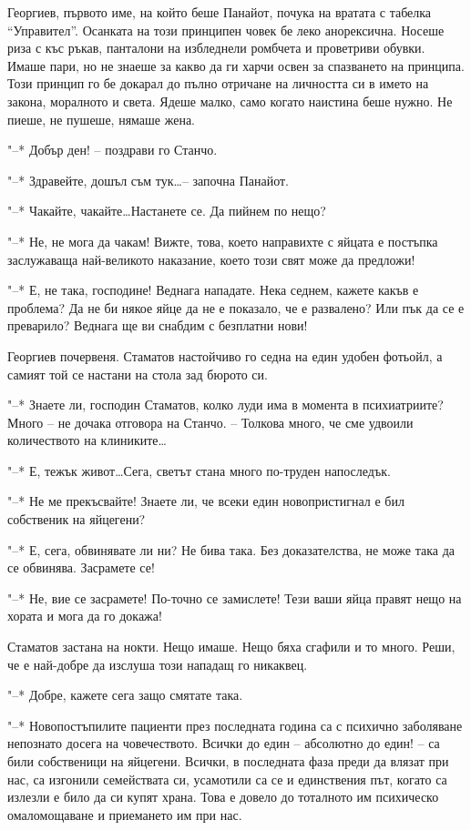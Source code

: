 \documentclass[ebook,openany,12pt]{memoir}
\begin{document}
Георгиев, първото име, на който беше Панайот, почука на вратата с табелка ``Управител''. Осанката на този принципен човек бе леко анорексична. Носеше риза с къс ръкав, панталони на избледнели ромбчета и проветриви обувки. Имаше пари, но не знаеше за какво да ги харчи освен за спазването на принципа. Този принцип го бе докарал до пълно отричане на личността си в името на закона, моралното и света. Ядеше малко, само когато наистина беше нужно. Не пиеше, не пушеше, нямаше жена.

"--* Добър ден! – поздрави го Станчо.

"--* Здравейте, дошъл съм тук\ldots – започна Панайот.

"--* Чакайте, чакайте\ldots Настанете се. Да пийнем по нещо?

"--* Не, не мога да чакам! Вижте, това, което направихте с яйцата е постъпка заслужаваща най-великото наказание, което този свят може да предложи!

"--* Е, не така, господине! Веднага нападате. Нека седнем, кажете какъв е проблема? Да не би някое яйце да не е показало, че е развалено? Или пък да се е преварило? Веднага ще ви снабдим с безплатни нови!

Георгиев почервеня. Стаматов настойчиво го седна на един удобен фотьойл, а самият той се настани на стола зад бюрото си.

"--* Знаете ли, господин Стаматов, колко луди има в момента в психиатриите? Много – не дочака отговора на Станчо. – Толкова много, че сме удвоили количеството на клиниките\ldots

"--* Е, тежък живот\ldots Сега, светът стана много по-труден напоследък. 

"--* Не ме прекъсвайте! Знаете ли, че всеки един новопристигнал е бил собственик на яйцегени?

"--* Е, сега, обвинявате ли ни? Не бива така. Без доказателства, не може така да се обвинява. Засрамете се!

"--* Не, вие се засрамете! По-точно се замислете! Тези ваши яйца правят нещо на хората и мога да го докажа!

Стаматов застана на нокти. Нещо имаше. Нещо бяха сгафили и то много. Реши, че е най-добре да изслуша този нападащ го никаквец.

"--* Добре, кажете сега защо смятате така.

"--* Новопостъпилите пациенти през последната година са с психично заболяване непознато досега на човечеството. Всички до един – абсолютно до един! – са били собственици на яйцегени. Всички, в последната фаза преди да влязат при нас, са изгонили семействата си, усамотили са се и единствения път, когато са излезли е било да си купят храна. Това е довело до тоталното им психическо омаломощаване и приемането им при нас.
\end{document}
